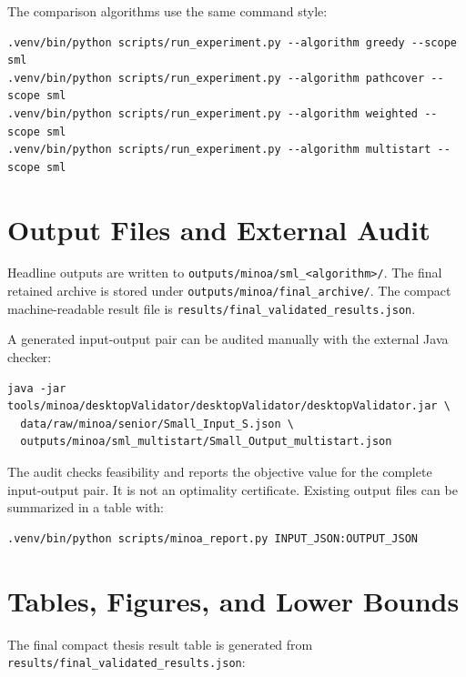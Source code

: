 The comparison algorithms use the same command style:

\begin{lstlisting}[basicstyle=\ttfamily\scriptsize,breaklines=true,aboveskip=4pt,belowskip=4pt]
.venv/bin/python scripts/run_experiment.py --algorithm greedy --scope sml
.venv/bin/python scripts/run_experiment.py --algorithm pathcover --scope sml
.venv/bin/python scripts/run_experiment.py --algorithm weighted --scope sml
.venv/bin/python scripts/run_experiment.py --algorithm multistart --scope sml
\end{lstlisting}

\section{Output Files and External Audit}

Headline outputs are written to \texttt{outputs/minoa/sml\_<algorithm>/}. The
final retained archive is stored under \texttt{outputs/minoa/final\_archive/}.
The compact machine-readable result file is
\texttt{results/final\_validated\_results.json}.

A generated input-output pair can be audited manually with the external Java
checker:

\begin{lstlisting}[basicstyle=\ttfamily\scriptsize,breaklines=true,aboveskip=4pt,belowskip=4pt]
java -jar tools/minoa/desktopValidator/desktopValidator/desktopValidator.jar \
  data/raw/minoa/senior/Small_Input_S.json \
  outputs/minoa/sml_multistart/Small_Output_multistart.json
\end{lstlisting}

The audit checks feasibility and reports the objective value for the complete
input-output pair. It is not an optimality certificate. Existing output files
can be summarized in a table with:

\begin{lstlisting}[basicstyle=\ttfamily\scriptsize,breaklines=true,aboveskip=4pt,belowskip=4pt]
.venv/bin/python scripts/minoa_report.py INPUT_JSON:OUTPUT_JSON
\end{lstlisting}

\section{Tables, Figures, and Lower Bounds}

The final compact thesis result table is generated from
\texttt{results/final\_validated\_results.json}:

